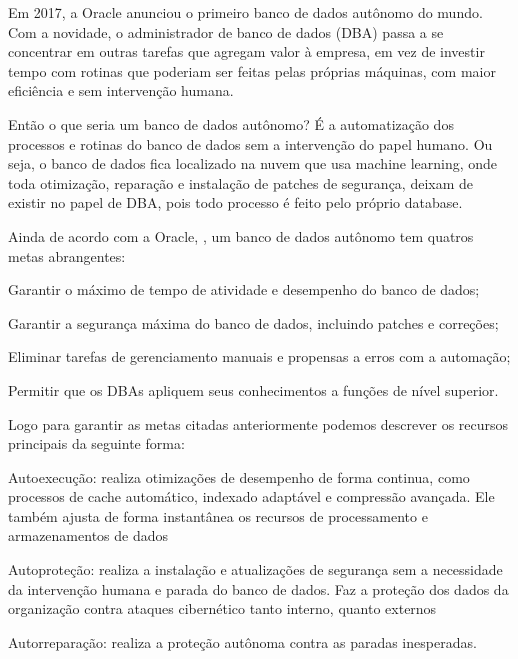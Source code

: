 \begin{citacao}
Em 2017, a Oracle anunciou o primeiro banco de dados autônomo do mundo. Com a novidade, o administrador de banco de dados (DBA) passa a se concentrar em outras tarefas que agregam valor à empresa, em vez de investir tempo com rotinas que poderiam ser feitas pelas próprias máquinas, com maior eficiência e sem intervenção humana.\cite[p. ~34]{TecnoBlog}
\end{citacao}

Então o que seria um banco de dados autônomo? É a automatização dos processos e rotinas do banco de dados sem a intervenção do papel humano. Ou seja, o banco de dados fica localizado na nuvem que usa machine learning, onde toda otimização, reparação e instalação de patches de segurança, deixam de existir no papel de DBA, pois todo processo é feito pelo próprio database.


Ainda de acordo com a Oracle, \cite{OracleDataBase}, um banco de dados autônomo tem quatros metas abrangentes:
\begin{alineas}
\item Garantir o máximo de tempo de atividade e desempenho do banco de dados;
\item Garantir a segurança máxima do banco de dados, incluindo patches e correções;
\item Eliminar tarefas de gerenciamento manuais e propensas a erros com a automação;
\item Permitir que os DBAs apliquem seus conhecimentos a funções de nível superior.
\end{alineas}


Logo para garantir as metas citadas anteriormente podemos descrever os recursos principais da seguinte forma:

\begin{alineas}
\item Autoexecução: realiza otimizações de desempenho de forma continua, como processos de cache automático, indexado adaptável e compressão avançada. Ele também ajusta de forma instantânea os recursos de processamento e armazenamentos de dados
\item Autoproteção: realiza a instalação e atualizações de segurança sem a necessidade da intervenção humana e parada do banco de dados. Faz a proteção dos dados da organização contra ataques cibernético tanto interno, quanto externos
\item Autorreparação: realiza a proteção autônoma contra as paradas inesperadas.
\end{alineas}


